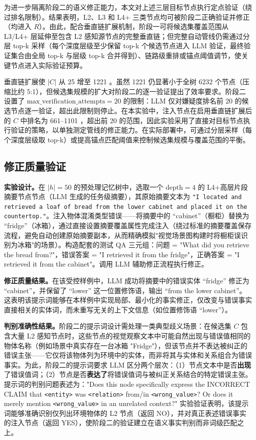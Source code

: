 为进一步隔离阶段二的语义修正能力，本文对上述三层目标节点执行定点验证（绕过排名限制）。结果表明，L2、L3 和 L4+ 三类节点均可被阶段二正确验证并修正（均进入 $R$）。由此，配合垂直链扩展机制，阶段一可将候选集覆盖范围从 L3/L4+ 层延伸至包含 L2 感知源节点的完整垂直链；但完整自动管线仍需通过分层 top-k 采样（每个深度层级至少保留 top-k 个候选节点进入 LLM 验证，最终验证集合由全局 top-k 与层级 top-k 合并得到）、链路级重排或锚点阈值调节，使关键节点进入实际验证预算。

垂直链扩展使 $|C|$ 从 25 增至 1221 。虽然 1221 仍显著小于全树 6232 个节点（压缩比约 5:1），但候选集规模的扩大对阶段二的逐一验证提出了效率要求。阶段二设置了 $\mathrm{max\_verification\_attempts}=20$ 的限制：LLM 仅对嫌疑度排名前 20 的候选节点逐一验证，超出此限制则停止。在本实验中，注入节点在启用垂直链扩展后的 $C$ 中排名为 661–1101 ，超出前 20 的范围，因此实验采用了直接对目标节点执行验证的策略，以单独测定管线的修正能力。在实际部署中，可通过分层采样（每个深度层级取 top-k）或提高锚点匹配阈值来控制候选集规模与覆盖范围的平衡。

\subsection{修正质量验证}

\textbf{实验设计。}在 $|h|=50$ 的预处理记忆树中，选取一个 $\mathrm{depth}=4$ 的 L4+高层片段摘要节点节点（LLM 生成的任务级摘要），其原始摘要文本为 \texttt{"I located and retrieved a loaf of bread from the lower cabinet and placed it on the countertop."}。注入物体混淆类型错误——将摘要中的 “cabinet”（橱柜）替换为 “fridge”（冰箱），通过直接设置摘要覆盖属性完成注入（绕过标准的摘要覆盖保存流程，避免自动创建原始摘要副本，从而精确模拟"视觉场景图构建时将橱柜误识别为冰箱"的场景）。构造配套的测试 QA 三元组：问题 = "What did you retrieve the bread from?"，错误答案 = "I retrieved it from the fridge"，正确答案 = "I retrieved it from the cabinet"。调用 LLM 辅助修正流程执行修正。

\textbf{修正质量结果。}在该受控样例中，LLM 成功将摘要中的错误实体 “fridge” 修正为 “cabinet”，并保留了 “lower” 这一位置修饰语，输出 “from the lower cabinet”。这表明该提示词能够在本样例中实现局部、最小化的事实修正，仅改变与错误事实直接相关的实体词，而未重写无关的上下文信息（如位置修饰语 “lower”）。

\textbf{判别准确性结果。}阶段二的提示词设计需处理一类典型歧义场景：在候选集 $C$ 包含大量 L2 感知节点时，这些节点的视觉观察文本中可能自然出现与错误值相同的物体名称（例如场景中真实存在一台冰箱 "Fridge"），但该节点并不表达被纠正的错误主张——它仅将该物体列为环境中的实体，而非将其与实体和关系组合为错误事实。为此，阶段二的提示词要求 LLM 区分两个层次：（1）节点文本中是否\textbf{出现}了错误值词；（2）节点是否\textbf{表达了}将错误值词与被纠正关系结合的特定错误主张。提示词的判别问题表述为："Does this node specifically express the INCORRECT CLAIM that \texttt{<entity>} was \texttt{<relation>} from/in \texttt{<wrong\_value>}? Or does it merely mention \texttt{<wrong\_value>} in an unrelated context?" 实验验证表明，该提示词能够准确识别仅列出环境物体的 L2 节点（返回 NO），并对真正表述错误事实的注入节点（返回 YES），使阶段二的验证建立在语义事实判别而非词级匹配之上。

